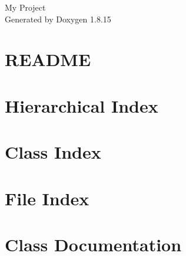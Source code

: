 \let\mypdfximage\pdfximage\def\pdfximage{\immediate\mypdfximage}\documentclass[twoside]{book}
\newcommand{\+}{\discretionary{\mbox{\scriptsize$\hookleftarrow$}}{}{}}
\newcommand{\clearemptydoublepage}{%
  \newpage{\pagestyle{empty}\cleardoublepage}%
}
\begin{document}
\hypersetup{pageanchor=false,
             bookmarksnumbered=true,
             pdfencoding=unicode
            }
\begin{titlepage}
\vspace*{7cm}
\begin{center}%
{\Large My Project }\\
\vspace*{1cm}
{\large Generated by Doxygen 1.8.15}\\
\end{center}
\end{titlepage}
\clearemptydoublepage
{}
\tableofcontents
\clearemptydoublepage
{}
\hypersetup{pageanchor=true}

\chapter{R\+E\+A\+D\+ME}
\label{md__r_e_a_d_m_e}

\chapter{Hierarchical Index}

\chapter{Class Index}

\chapter{File Index}

\chapter{Class Documentation}





























\end{document}
